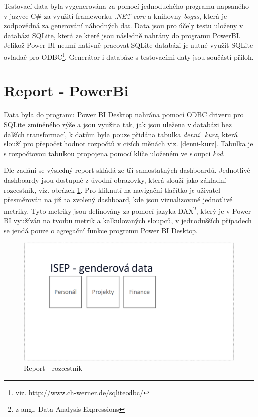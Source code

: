 \documentclass[
  digital,     %
  twoside,     %
  lof,         %
  lot,         %
]{fithesis4}
\begin{document}
Testovací data byla vygenerována za pomocí jednoduchého programu napsaného v jazyce C\# za využití frameworku \emph{.NET core} a knihovny \emph{bogus}, která je zodpovědná za generování náhodných dat. Data jsou pro účely testu uloženy v databázi SQLite, která ze které jsou následně nahrány do programu PowerBI. Jelikož Power BI neumí nativně pracovat SQLite databázi je nutné využít SQLite ovladač pro ODBC\footnote{viz. http://www.ch-werner.de/sqliteodbc/}. Generátor i databáze s testovacími daty jsou součástí příloh.



\section{Report - PowerBi}
Data byla do programu Power BI Desktop nahrána pomocí ODBC driveru pro SQLite zmíněného výše a jsou využita tak, jak jsou uležena v databázi bez dalších transformací, k datům byla pouze přidána tabulka \emph{denní\_kurz}, která slouží pro přepočet hodnot rozpočtů v cizích měnách viz. \ref{denni-kurz}. Tabulka je s rozpočtovou tabulkou propojena pomocí klíče uloženém ve sloupci \emph{kod}.  

Dle zadání se výsledný report skládá ze tří samostatných dashboardů. Jednotlivé dashboardy jsou dostupné z úvodní obrazovky, která slouží jako základní rozcestník, viz. obrázek \ref{fig:crossroad}. Pro kliknutí na navigační tlačítko je uživatel přesměrován na již na zvolený dashboard, kde jsou vizualizované jednotlivé metriky. Tyto metriky jsou definovány za pomocí jazyka DAX\footnote{z angl. Data Analysis Expressions}, který je v Power BI využíván na tvorbu metrik a kalkulovaných sloupců, v jednodušších případech se jendá pouze o agregační funkce programu Power BI Desktop.
    \begin{figure}[t]
        \begin{center}
            \includegraphics[width=13cm]{img/crossroad.png}
        \end{center}
        \caption{Report - rozcestník}
        \label{fig:crossroad}
    \end{figure}
\end{document}

